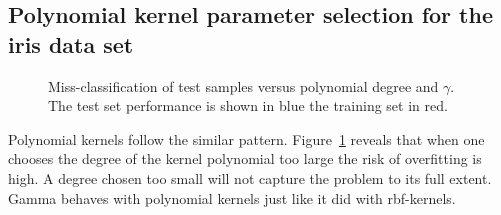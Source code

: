 \subsection{Polynomial kernel parameter selection for the iris data set}
\begin{figure}
\centering


\caption{Miss-classification of test samples versus polynomial degree and $\gamma$. The test set performance is shown in blue the training set in red.}
\label{fig:ployDegGamma}
\end{figure}
Polynomial kernels follow the similar pattern. Figure~\ref*{fig:ployDegGamma} reveals that when one chooses the degree of the kernel polynomial too large the risk of overfitting is high. A degree chosen too small will not capture the problem to its full extent. Gamma behaves with polynomial kernels just like it did with rbf-kernels.  

